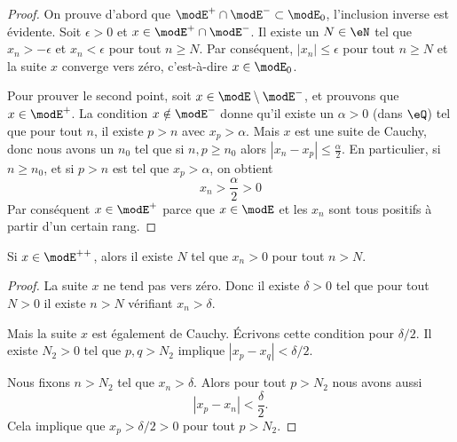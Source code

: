 \begin{proof}
    On prouve d'abord que \( \modE^+\cap\modE^-\subset\modE_0\), l'inclusion inverse est évidente. Soit \( \epsilon>0\) et \( x\in \modE^+\cap\modE^-\). Il existe un \( N\in \eN\) tel que \( x_n>-\epsilon\) et \( x_n<\epsilon\) pour tout \( n\geq N\). Par conséquent, \( | x_n |\leq \epsilon\) pour tout \( n\geq N\) et la suite \( x\) converge vers zéro, c'est-à-dire \( x\in\modE_0\).

    Pour prouver le second point, soit \( x\in \modE\setminus\modE^-\), et prouvons que \( x\in\modE^+\). La condition \( x\notin \modE^-\) donne qu'il existe un \( \alpha>0\) (dans \( \eQ\)) tel que pour tout \( n\), il existe \( p>n\) avec \( x_p>\alpha\). Mais \( x\) est une suite de Cauchy, donc nous avons un \( n_0\) tel que si \( n,p\geq n_0\) alors \( | x_n-x_p |\leq \frac{ \alpha }{2}\). En particulier, si \( n\geq n_0\), et si \( p>n\) est tel que \( x_p>\alpha\), on obtient
    \begin{equation}
        x_n>\frac{ \alpha }{2}>0
    \end{equation}
    Par conséquent \( x\in\modE^+\) parce que \( x\in\modE\) et les \( x_n \) sont tous positifs à partir d'un certain rang.
\end{proof}

\begin{lemma}        \label{LEMooXNWSooHbNcAV}
    Si \( x\in \modE^{++}\), alors il existe \( N\) tel que \( x_n>0\) pour tout \( n>N\).
\end{lemma}

\begin{proof}
    La suite \( x\) ne tend pas vers zéro. Donc il existe \( \delta>0\) tel que pour tout \( N>0\) il existe \( n>N\) vérifiant \( x_n>\delta\).

    Mais la suite \( x\) est également de Cauchy. Écrivons cette condition pour \( \delta/2\). Il existe \( N_2>0\) tel que \( p,q>N_2\) implique \( | x_p-x_q |<\delta/2\).

    Nous fixons \( n>N_2\) tel que \( x_n>\delta\). Alors pour tout \( p>N_2\) nous avons aussi
    \begin{equation}
        | x_p-x_n |<\frac{ \delta }{2}.
    \end{equation}
    Cela implique que \( x_p>\delta/2>0\) pour tout \( p>N_2\).
\end{proof}



